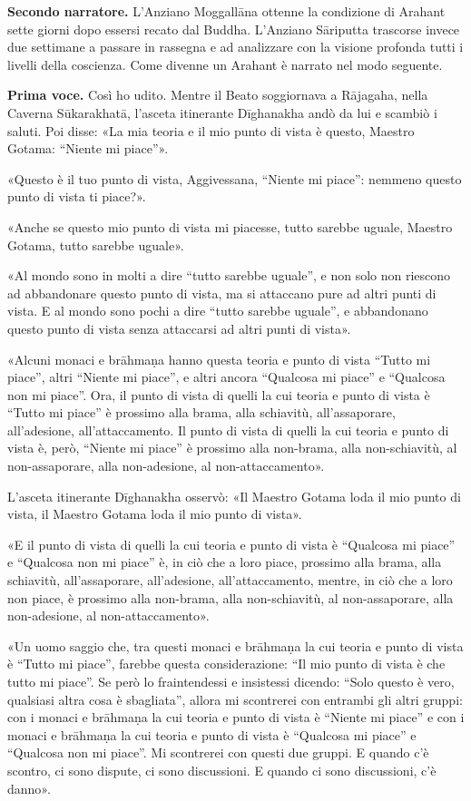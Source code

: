 \textbf{Secondo narratore.} L’Anziano Moggallāna ottenne la condizione di
Arahant sette giorni dopo essersi recato dal Buddha. L’Anziano Sāriputta
trascorse invece due settimane a passare in rassegna e ad analizzare con
la visione profonda tutti i livelli della coscienza. Come divenne un
Arahant è narrato nel modo seguente.


\textbf{Prima voce.} Così ho udito. Mentre il Beato soggiornava a Rājagaha, nella
Caverna Sūkarakhatā, l’asceta itinerante Dīghanakha andò da lui e
scambiò i saluti. Poi disse: «La mia teoria e il mio punto di vista è
questo, Maestro Gotama: “Niente mi piace”».


«Questo è il tuo punto di vista, Aggivessana, “Niente mi piace”: nemmeno
questo punto di vista ti piace?».


«Anche se questo mio punto di vista mi piacesse, tutto sarebbe uguale,
Maestro Gotama, tutto sarebbe uguale».


«Al mondo sono in molti a dire “tutto sarebbe uguale”, e non solo non
riescono ad abbandonare questo punto di vista, ma si attaccano pure ad
altri punti di vista. E al mondo sono pochi a dire “tutto sarebbe
uguale”, e abbandonano questo punto di vista senza attaccarsi ad altri
punti di vista».


«Alcuni monaci e brāhmaṇa hanno questa teoria e punto di vista “Tutto mi
piace”, altri “Niente mi piace”, e altri ancora “Qualcosa mi piace” e
“Qualcosa non mi piace”. Ora, il punto di vista di quelli la cui teoria
e punto di vista è “Tutto mi piace” è prossimo alla brama, alla
schiavitù, all’assaporare, all’adesione, all’attaccamento. Il punto di
vista di quelli la cui teoria e punto di vista è, però, “Niente mi
piace” è prossimo alla non-brama, alla non-schiavitù, al non-assaporare,
alla non-adesione, al non-attaccamento».


L’asceta itinerante Dīghanakha osservò: «Il Maestro Gotama loda il mio
punto di vista, il Maestro Gotama loda il mio punto di vista».


«E il punto di vista di quelli la cui teoria e punto di vista è
“Qualcosa mi piace” e “Qualcosa non mi piace” è, in ciò che a loro
piace, prossimo alla brama, alla schiavitù, all’assaporare,
all’adesione, all’attaccamento, mentre, in ciò che a loro non piace, è
prossimo alla non-brama, alla non-schiavitù, al non-assaporare, alla
non-adesione, al non-attaccamento».


«Un uomo saggio che, tra questi monaci e brāhmaṇa la cui teoria e punto
di vista è “Tutto mi piace”, farebbe questa considerazione: “Il mio
punto di vista è che tutto mi piace”. Se però lo fraintendessi e
insistessi dicendo: “Solo questo è vero, qualsiasi altra cosa è
sbagliata”, allora mi scontrerei con entrambi gli altri gruppi: con i
monaci e brāhmaṇa la cui teoria e punto di vista è “Niente mi piace” e
con i monaci e brāhmaṇa la cui teoria e punto di vista è “Qualcosa mi
piace” e “Qualcosa non mi piace”. Mi scontrerei con questi due gruppi. E
quando c’è scontro, ci sono dispute, ci sono discussioni. E quando ci
sono discussioni, c’è danno».


